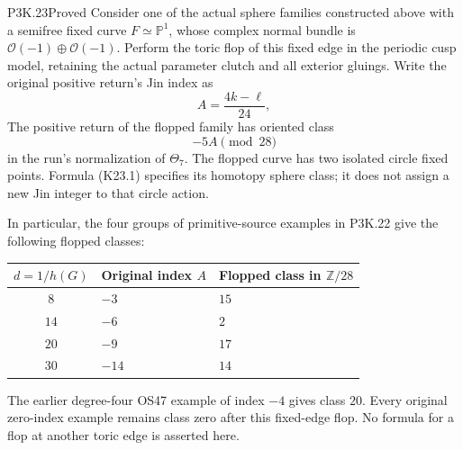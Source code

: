 \begin{statement}{P3K.23}{Proved}
Consider one of the actual sphere families constructed above with a
semifree fixed curve \(F\simeq\mathbb P^1\), whose complex normal bundle
is \(\mathcal O(-1)\oplus\mathcal O(-1)\). Perform the toric flop of
this fixed edge in the periodic cusp model, retaining the actual
parameter clutch and all exterior gluings. Write the original positive
return's Jin index as
\[
             A=\frac{4k-\ell}{24},
\]
The positive return of the flopped family has oriented class
\[
                         -5A\pmod {28}                 \tag{K23.1}
\]
in the run's normalization of \(\Theta _7\). The flopped curve has two
isolated circle fixed points. Formula (K23.1) specifies its homotopy
sphere class; it does not assign a new Jin integer to that circle
action.

In particular, the four groups of primitive-source examples in
P3K.22 give the following flopped classes:


\begin{center}\small\begin{tabular}{c l l}\hline
\(d=1/h(G)\) & Original index \(A\) & Flopped class in \(\mathbb Z/28\) \\
\hline
\(8\) & \(-3\) & \(15\) \\
\(14\) & \(-6\) & \(2\) \\
\(20\) & \(-9\) & \(17\) \\
\(30\) & \(-14\) & \(14\) \\
\hline\end{tabular}\end{center}

The earlier degree-four OS47 example of index \(-4\) gives class
\(20\). Every original zero-index example remains class zero after
this fixed-edge flop. No formula for a flop at another toric edge is
asserted here.
\end{statement}

